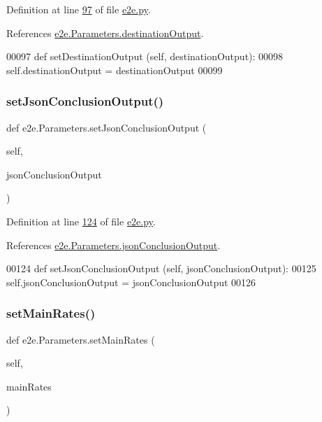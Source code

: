 Definition at line \hyperlink{e2e_8py_source_l00097}{97} of file \hyperlink{e2e_8py_source}{e2e.\+py}.



References \hyperlink{e2e_8py_source_l00036}{e2e.\+Parameters.\+destination\+Output}.


\begin{DoxyCode}
00097     \textcolor{keyword}{def }setDestinationOutput (self, destinationOutput):
00098         self.destinationOutput = destinationOutput 
00099 
\end{DoxyCode}
\mbox{\label{classe2e_1_1_parameters_a449da873b24a00fd81746b4344985654}} 
\subsubsection{\texorpdfstring{set\+Json\+Conclusion\+Output()}{setJsonConclusionOutput()}}
{\footnotesize\ttfamily def e2e.\+Parameters.\+set\+Json\+Conclusion\+Output (\begin{DoxyParamCaption}\item[{}]{self,  }\item[{}]{json\+Conclusion\+Output }\end{DoxyParamCaption})}



Definition at line \hyperlink{e2e_8py_source_l00124}{124} of file \hyperlink{e2e_8py_source}{e2e.\+py}.



References \hyperlink{e2e_8py_source_l00040}{e2e.\+Parameters.\+json\+Conclusion\+Output}.


\begin{DoxyCode}
00124     \textcolor{keyword}{def }setJsonConclusionOutput (self, jsonConclusionOutput):
00125         self.jsonConclusionOutput = jsonConclusionOutput
00126 
\end{DoxyCode}
\mbox{\label{classe2e_1_1_parameters_a57b1265982f14c075d2f1ab909383f5d}} 
\subsubsection{\texorpdfstring{set\+Main\+Rates()}{setMainRates()}}
{\footnotesize\ttfamily def e2e.\+Parameters.\+set\+Main\+Rates (\begin{DoxyParamCaption}\item[{}]{self,  }\item[{}]{main\+Rates }\end{DoxyParamCaption})}



